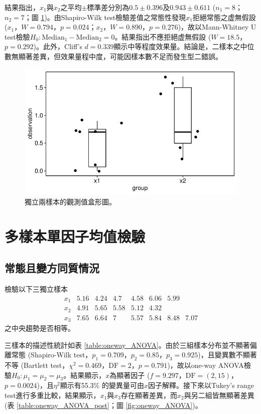 \documentclass[12pt]{article}
\begin{document}
結果指出，$x_1$與$x_2$之平均$\pm$標準差分別為$0.5 \pm 0.396$及$0.943 \pm 0.611$ ($n_1 = 8$；$n_2=7$；圖 \ref{fig:non-normal_independent_test})。由Shapiro-Wilk test檢驗差值之常態性發現$x_1$拒絕常態之虚無假設 ($x_1$，$W = 0.794$，$p = 0.024$；$x_2$，$W = 0.890$，$p = 0.276$)，故以Mann-Whitney U test檢驗$H_0: \text{Median}_1 - \text{Median}_2 = 0$。結果指出不應拒絕虚無假設 ($W = 18.5$，$p = 0.292$)。此外，Cliff's $d=0.339$顯示中等程度效果量。結論是，二樣本之中位數無顯著差異，但效果量程中度，可能因樣本數不足而發生型二錯誤。
\begin{figure}[htb!]
	\centering
	\includegraphics[]{non-normal_independent_test.pdf}
	\caption{獨立兩樣本的觀測值盒形圖。}
	\label{fig:non-normal_independent_test}
\end{figure}

\section{多樣本單因子均值檢驗}
\subsection{常態且變方同質情況}
檢驗以下三獨立樣本
\[
\begin{matrix}
x_1 & 5.16 & 4.24 & 4.7 & 4.58 & 6.06 & 5.99 &  \\
x_2 & 4.91 & 5.65 & 5.58 & 5.12 & 4.32 & & \\
x_3 & 7.65 & 6.64 & 7 & 5.57 & 5.84 & 8.48 & 7.07
\end{matrix}
\]
之中央趨勢是否相等。

三樣本的描述性統計如表 \ref{table:oneway_ANOVA}。由於三組樣本分布並不顯著偏離常態 (Shapiro-Wilk test，$p_1 = 0.709$，$p_2 = 0.85$，$p_3 = 0.925$)，且變異數不顯著不等 (Bartlett test，$\chi^2 = 0.469$，$\text{DF} = 2$，$p = 0.791$)，故以one-way ANOVA檢驗$H_0:\mu_1 = \mu_2 = \mu_3$。結果顯示，$x$為顯著因子 ($f = 9.297$，$\text{DF} = (2, 15)$，$p = 0.0024$)，且$\eta^2$顯示有55.3\% 的變異量可由$x$因子解釋。接下來以Tukey's range test進行多重比較，結果顯示，$x_1$與$x_3$存在顯著差異，而$x_2$與另二組皆無顯著差異 (表 \ref{table:oneway_ANOVA_post}；圖 \ref{fig:oneway_ANOVA})。
\end{document}
